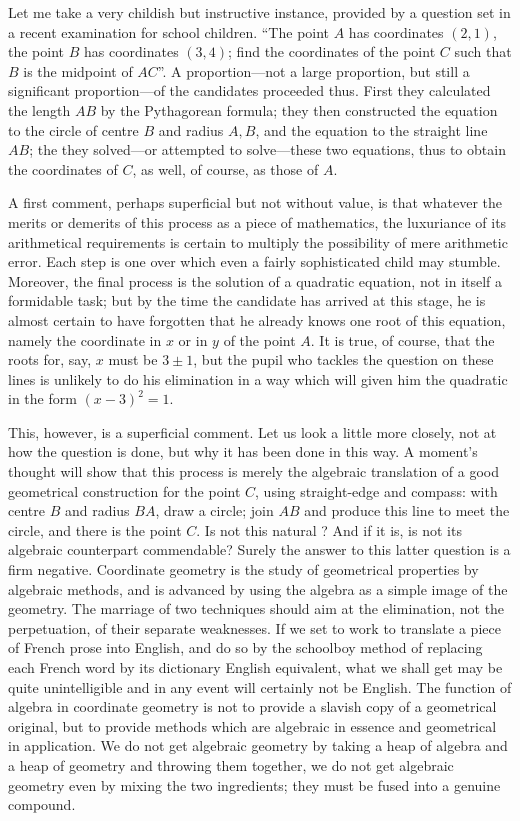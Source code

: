 Let me take a very childish but instructive instance, provided by a
question set in a recent examination for school children. ``The point
$A$ has coordinates $(2,1)$, the point $B$ has coordinates $(3,4)$;
find the coordinates of the point $C$ such that $B$ is the midpoint of
$AC$''. A proportion---not a large proportion, but still a significant
proportion---of the candidates proceeded thus. First they calculated
the length $AB$ by the Pythagorean formula; they then constructed the
equation to the circle of centre $B$ and radius $A,B$, and the
equation to the straight line $AB$; the they solved---or attempted to
solve---these two equations, thus to obtain the coordinates of $C$, as
well, of course, as those of $A$.

A first comment, perhaps superficial but not without value, is that
whatever the merits or demerits of this process as a piece of
mathematics, the luxuriance of its arithmetical requirements is
certain to multiply the possibility of mere arithmetic error. Each
step is one over which even a fairly sophisticated child may
stumble. Moreover, the final process is the solution of a quadratic
equation, not in itself a formidable task; but by the time the
candidate has arrived at this stage, he is almost certain to have
forgotten that he  already knows one root of this equation, namely the
coordinate in $x$ or in $y$ of the point $A$. It is true, of course,
that the roots for, say, $x$ must be $3 \pm 1$, but the pupil who
tackles the question on these lines is unlikely to do his elimination
in a way which will given him the quadratic in the form $(x-3)^2=1$.

This, however, is a superficial comment. Let us look a little more
closely, not at how the question is done, but why it has been done in
this way. A moment's thought will show that this process is merely the
algebraic translation of a good geometrical construction for the point
$C$, using straight-edge and compass: with centre $B$ and radius $BA$,
draw a circle; join $AB$ and produce this line to meet the circle, and\pageoriginale
there is the point $C$. Is not this natural ? And if it is, is not its
algebraic counterpart commendable? Surely the answer to this latter
question is a firm negative. Coordinate geometry is the study of
geometrical properties by algebraic methods, and is advanced by using
the algebra as a simple image of the geometry. The marriage of two
techniques should aim at the elimination, not the perpetuation, of
their separate weaknesses. If we set to work to translate a piece of
French prose into English, and do so by the schoolboy method of
replacing each French word by its dictionary English equivalent, what
we shall get may be quite unintelligible and in any event will
certainly not be English. The function of algebra in coordinate
geometry is not to provide a slavish copy of a geometrical original,
but to provide methods which are algebraic in essence and geometrical
in application. We do not get algebraic geometry by taking a heap of
algebra and a heap of geometry and throwing them together, we do not
get algebraic geometry even by mixing the two ingredients; they must
be fused into a genuine compound.

